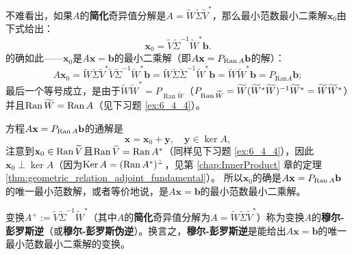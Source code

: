 不难看出，如果$A$的{\bf 简化}奇异值分解是$A=\widetilde{W}\widetilde{\Sigma}\widetilde{V}^*$，那么最小范数最小二乘解$\mathbf{x}_0$由下式给出：
\begin{equation}\label{ls_ln_sol}
    \mathbf{x}_{0}=\widetilde{V}\widetilde{\Sigma}^{-1}\widetilde{W}^{*}\mathbf{b}.
\end{equation}
的确如此——$\mathbf{x}_0$是$A\mathbf{x}=\mathbf{b}$的最小二乘解（即$A\mathbf{x}=P_{\operatorname{Ran} A}\mathbf{b}$的解）：
\[A\mathbf{x}_{0}=\widetilde{W}\widetilde{\Sigma}\widetilde{V}^{*}\widetilde{V}\widetilde{\Sigma}^{-1}\widetilde{W}^{*}\mathbf{b}=\widetilde{W}\widetilde{\Sigma}\widetilde{\Sigma}^{-1}\widetilde{W}^{*}\mathbf{b}=\widetilde{W}\widetilde{W}^{*}\mathbf{b}=P_{\mathrm{Ran}A}\mathbf{b};\]
最后一个等号成立，是由于$\widetilde{W}\widetilde{W}^{*}=P_{\operatorname{Ran}\widetilde{W}}$（$P_{\operatorname{Ran}\widetilde{W}}=\widetilde{W}(\widetilde{W}^{*}\widetilde{W})^{-1}\widetilde{W}^{*}=\widetilde{W}\widetilde{W}^{*}$）并且$\operatorname{Ran}\widetilde{W}=\operatorname{Ran} A$（见下习题 \ref{ex:6_4_4}）。

方程$A\mathbf{x}=P_{\operatorname{Ran} A}\mathbf{b}$的通解是
\[\mathbf{x}=\mathbf{x}_0+\mathbf{y},\quad \mathbf{y}\in\ker A,\]
注意到$\mathbf{x}_0\in \operatorname{Ran} \widetilde{V}$且$\operatorname{Ran} \widetilde{V}=\operatorname{Ran} A^*$（同样见下习题 \ref{ex:6_4_4}），因此 $\mathbf{x}_0\perp \ker A$（因为$\operatorname{Ker} A = (\operatorname{Ran} A^*)^\perp$，见第 \ref{chap:InnerProduct} 章的定理 \ref{thm:geometric_relation_adjoint_fundamental}）。
所以$\mathbf{x}_0$的确是$A\mathbf{x}=P_{\operatorname{Ran} A}\mathbf{b}$的唯一最小范数解，或者等价地说，是$A\mathbf{x}=\mathbf{b}$的最小范数最小二乘解。

\begin{definition}
    变换$A^+:=\widetilde{V}\widetilde{\Sigma}^{-1}\widetilde{W}^{*}$（其中$A$的{\bf 简化}奇异值分解为$A=\widetilde{W}\widetilde{\Sigma}\widetilde{V}^*$）称为变换$A$的{\bf 穆尔-彭罗斯逆}（或{\bf 穆尔-彭罗斯伪逆}）。换言之，{\bf 穆尔-彭罗斯逆}是能给出$A\mathbf{x}=\mathbf{b}$的唯一最小范数最小二乘解的变换。
\end{definition}

